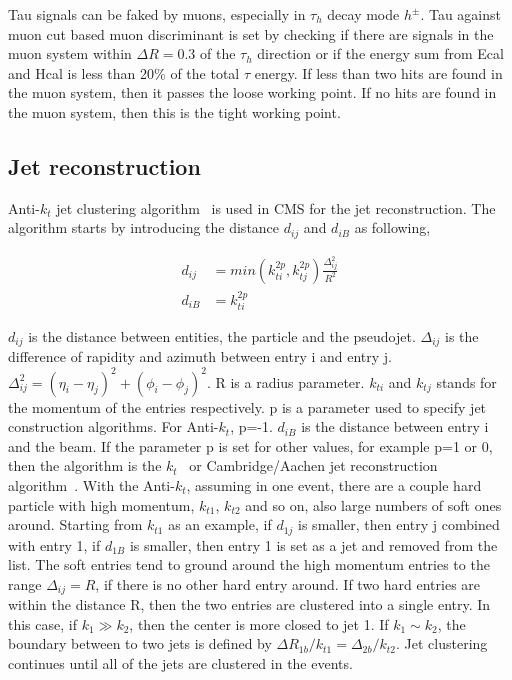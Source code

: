 Tau signals can be faked by muons, especially in $\tau_{h}$ decay mode $h^{\pm}$. Tau against muon cut based muon discriminant is set by checking if there are signals in the muon system within $\Delta R=0.3$ of the $\tau_{h}$ direction or if the energy sum from Ecal and Hcal is less than 20$\%$ of the total $\tau$ energy. If less than two hits are found in the muon system, then it passes the loose working point. If no hits are found in the muon system, then this is the tight working point. 

\subsection{Jet reconstruction}


Anti-$k_{t}$ jet clustering algorithm~\cite{Cacciari:2008gp} is used in CMS for the jet reconstruction. The algorithm starts by introducing the distance $d_{ij}$ and $d_{iB}$ as following,

\begin{align*}
d_{ij}&=min(k_{ti}^{2p},k_{tj}^{2p})\frac{\Delta_{ij}^{2}}{R^{2}}\\
d_{iB}&=k_{ti}^{2p}
\end{align*}

$d_{ij}$ is the distance between entities, the particle and the pseudojet. $\Delta_{ij}$ is the difference of rapidity and azimuth between entry i and entry j. $\Delta_{ij}^{2}=(\eta_{i}-\eta_{j})^{2}+(\phi_{i}-\phi_{j})^{2}$. R is a radius parameter. $k_{ti}$ and $k_{tj}$ stands for the momentum of the entries respectively. p is a parameter used to specify jet construction algorithms.  For Anti-$k_{t}$, p=-1. $d_{iB}$ is the distance between entry i and the beam. If the parameter p is set for other values, for example p=1 or 0, then the algorithm is the $k_t$~\cite{ktalgo} or Cambridge/Aachen jet reconstruction algorithm~\cite{Aachenjetalgo}.  With the Anti-$k_{t}$, assuming in one event, there are a couple hard particle with high momentum, $k_{t1}$, $k_{t2}$ and so on, also large numbers of soft ones around. Starting from $k_{t1}$ as an example, if $d_{1j}$ is smaller, then entry j combined with entry 1, if $d_{1B}$ is smaller, then entry 1 is set as a jet and removed from the list. The soft entries tend to ground around the high momentum entries to the range $\Delta_{ij}= R$, if there is no other hard entry around. If two hard entries are within the distance R, then the two entries are clustered into a single entry. In this case, if $k_{1}\gg k_{2}$, then the center is more closed to jet 1. If $k_{1}\sim k_{2}$, the boundary between to two jets is defined by $\Delta R_{1b}/k_{t1}=\Delta_{2b}/k_{t2}$. Jet clustering continues until all of the jets are clustered in the events. 

